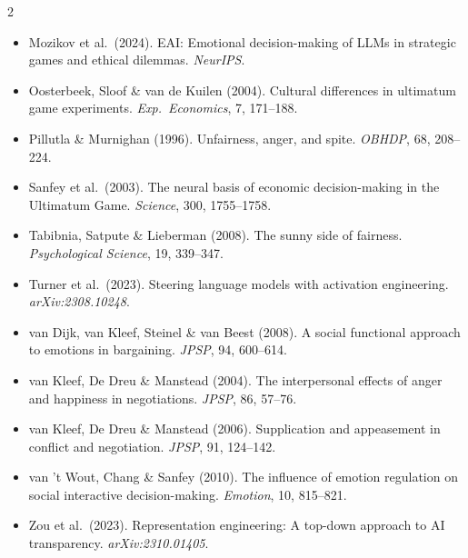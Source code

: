\documentclass[10pt,a4paper]{article}
\begin{document}
{\begin{multicols}{2}
\begin{itemize}[leftmargin=0.9em,itemsep=0pt,topsep=0pt,parsep=0pt]
  \item Mozikov et al.\ (2024). EAI: Emotional decision-making of LLMs in strategic games and ethical dilemmas. \textit{NeurIPS}.
  \item Oosterbeek, Sloof \& van de Kuilen (2004). Cultural differences in ultimatum game experiments. \textit{Exp.\ Economics}, 7, 171--188.
  \item Pillutla \& Murnighan (1996). Unfairness, anger, and spite. \textit{OBHDP}, 68, 208--224.
  \item Sanfey et al.\ (2003). The neural basis of economic decision-making in the Ultimatum Game. \textit{Science}, 300, 1755--1758.
  \item Tabibnia, Satpute \& Lieberman (2008). The sunny side of fairness. \textit{Psychological Science}, 19, 339--347.
  \item Turner et al.\ (2023). Steering language models with activation engineering. \textit{arXiv:2308.10248}.
  \item van Dijk, van Kleef, Steinel \& van Beest (2008). A social functional approach to emotions in bargaining. \textit{JPSP}, 94, 600--614.
  \item van Kleef, De Dreu \& Manstead (2004). The interpersonal effects of anger and happiness in negotiations. \textit{JPSP}, 86, 57--76.
  \item van Kleef, De Dreu \& Manstead (2006). Supplication and appeasement in conflict and negotiation. \textit{JPSP}, 91, 124--142.
  \item van 't Wout, Chang \& Sanfey (2010). The influence of emotion regulation on social interactive decision-making. \textit{Emotion}, 10, 815--821.
  \item Zou et al.\ (2023). Representation engineering: A top-down approach to AI transparency. \textit{arXiv:2310.01405}.
\end{itemize}
\end{multicols}}
\end{document}
